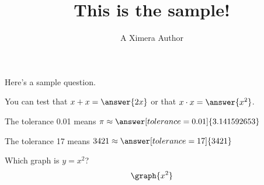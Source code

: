 \documentclass{ximera}
\title{This is the sample!}
\author{A Ximera Author}
\begin{document}
\maketitle

Here's a sample question.

\begin{problem}
\begin{multipleChoice}
\end{multipleChoice}
\end{problem}

\begin{problem}
   You can test that $x + x = \answer{2x}$ or that $x \cdot x = \answer{x^2}$.
\end{problem}

\begin{problem}
   The tolerance 0.01 means $\pi \approx \answer[tolerance=0.01]{3.141592653}$
\end{problem}

\begin{problem}
   The tolerance 17 means $3421 \approx \answer[tolerance=17]{3421}$
\end{problem}

\begin{problem}
    Which graph is $y=x^2$?
    $$\graph{x^2}$$
\begin{multipleChoice}
\end{multipleChoice}
\end{problem}
\end{document}

